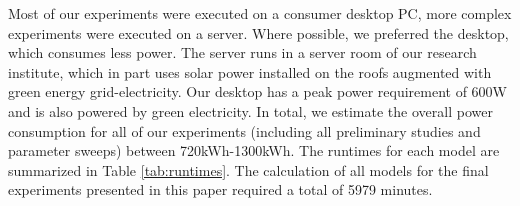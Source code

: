 \documentclass[11pt]{article}
\begin{document}
Most of our experiments were executed on a consumer desktop PC, more complex experiments were executed on a server.
Where possible, we preferred the desktop, which consumes less power.
The server runs in a server room of our research institute, which in part uses solar power installed on the roofs augmented with green energy grid-electricity.
Our desktop has a peak power requirement of 600W and is also powered by green electricity.
In total, we estimate the overall power consumption for all of our experiments (including all preliminary studies and parameter sweeps) between 720kWh-1300kWh.
The runtimes for each model are summarized in Table \ref{tab:runtimes}.
The calculation of all models for the final experiments presented in this paper required a total of 5979 minutes.

\end{document}
